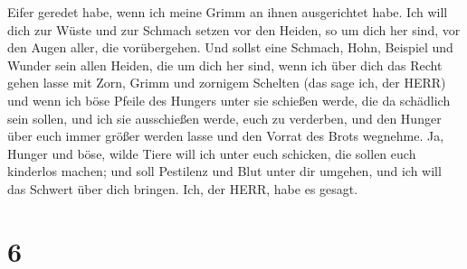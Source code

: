 Eifer geredet habe, wenn ich meine Grimm an ihnen ausgerichtet habe.
 Ich will dich zur Wüste und zur Schmach setzen vor den
Heiden, so um dich her sind, vor den Augen aller, die vorübergehen.
 Und sollst eine Schmach, Hohn, Beispiel und Wunder sein
allen Heiden, die um dich her sind, wenn ich über dich das Recht gehen
lasse mit Zorn, Grimm und zornigem Schelten (das sage ich, der HERR)
 und wenn ich böse Pfeile des Hungers unter sie schießen
werde, die da schädlich sein sollen, und ich sie ausschießen werde, euch
zu verderben, und den Hunger über euch immer größer werden lasse und den
Vorrat des Brots wegnehme.  Ja, Hunger und böse, wilde
Tiere will ich unter euch schicken, die sollen euch kinderlos machen;
und soll Pestilenz und Blut unter dir umgehen, und ich will das Schwert
über dich bringen. Ich, der HERR, habe es gesagt.

\hypertarget{section-5}{%
\section{6}\label{section-5}}

